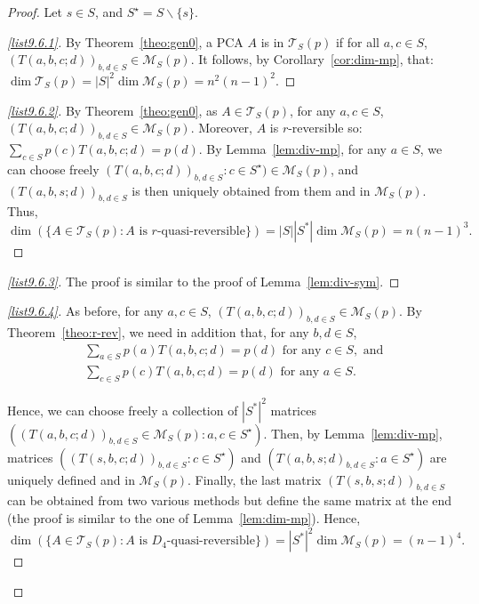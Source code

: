 \documentclass[AHL,Unicode,longabstracts]{cedram}
\newcounter{a}
\newcommand{\triang}[2]{\mathcal{T}_{#1} \left(#2 \right)}
\begin{document}
\begin{proof}
Let $s \in S$, and $S^\star = S \backslash \{s\}$.

\begin{proof}[{\eqref{list9.6.1}}]
By Theorem~\ref{theo:gen0}, a PCA $A$ is in $\triang{S}{p}$ if for all $a,c \in S$, $(T(a,b,c;d))_{b,d \in S} \in \mathcal{M}_S(p)$. It follows, by Corollary~\ref{cor:dim-mp}, that: $\dim \triang{S}{p} = |S|^2 \dim \mathcal{M}_S(p)= n^2 (n-1)^2$.
\let\qed\relax
\end{proof}

\begin{proof}[{\eqref{list9.6.2}}] By Theorem~\ref{theo:gen0}, as $A \in \triang{S}{p}$, for any $a,c \in S$, $(T(a,b,c;d))_{b,d \in S} \in \mathcal{M}_S(p)$. Moreover, $A$ is $r$-reversible so: $\sum_{c\in S} p(c) T(a,b,c;d) = p(d).$ By Lemma~\ref{lem:div-mp}, for any $a \in S$, we can choose freely $(T(a,b,c;d))_{b,d \in S} : c \in S^\star) \in \mathcal{M}_S(p)$, and $(T(a,b,s;d))_{b,d \in S}$ is then uniquely obtained from them and in $\mathcal{M}_S(p)$. Thus,
\[
\dim \left(\{A \in \triang{S}{p} : \text{$A$ is $r$-quasi-reversible}\} \right) = |S| |S^*| \dim \mathcal{M}_S(p) = n (n-1)^3.
\]
\let\qed\relax
\end{proof}

\begin{proof}[{\eqref{list9.6.3}}]
The proof is similar to the proof of Lemma~\ref{lem:div-sym}.
\let\qed\relax
\end{proof}

\begin{proof}[{\eqref{list9.6.4}}] As before, for any $a,c \in S$, $(T(a,b,c;d))_{b,d \in S} \in \mathcal{M}_S(p)$. By Theorem~\ref{theo:r-rev}, we need in addition that, for any $b,d \in S$,
\begin{align*}
& \sum_{a\in S} p(a) T(a,b,c;d) = p(d) \text{ for any } c \in S, \text{ and }\\
& \sum_{c\in S} p(c) T(a,b,c;d) = p(d) \text{ for any } a \in S.
\end{align*}

Hence, we can choose freely a collection of $|S^*|^2$ matrices $((T(a,b,c;d))_{b,d \in S} \in \mathcal{M}_S(p) : a,c \in S^\star)$. Then, by Lemma~\ref{lem:div-mp}, matrices $((T(s,b,c;d))_{b,d\in S} :c \in S^\star)$ and $(T(a,b,s;d)_{b,d \in S} : a \in S^\star)$ are uniquely defined and in $\mathcal{M}_S(p)$. Finally, the last matrix $(T(s,b,s;d))_{b,d \in S}$ can be obtained from two various methods but define the same matrix at the end (the proof is similar to the one of Lemma~\ref{lem:dim-mp}). Hence,
\[
\dim \left(\{A \in \triang{S}{p} : \text{$A$ is $D_4$-quasi-reversible}\} \right) = |S^*|^2 \dim \mathcal{M}_S(p) = (n-1)^4.
\]
\let\qed\relax
\end{proof}


\end{proof}
\end{document}
